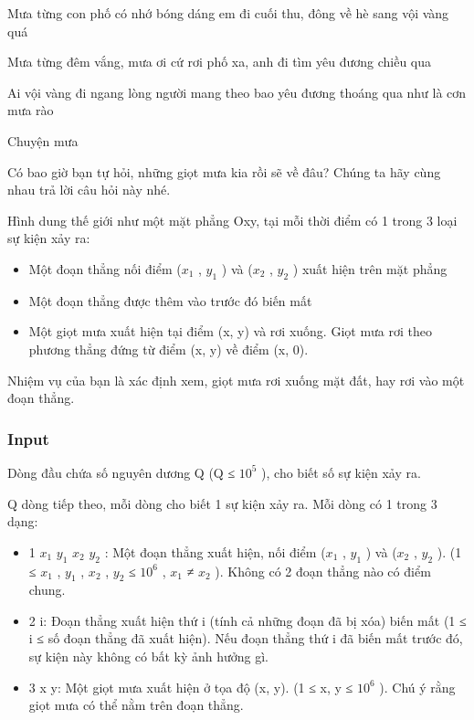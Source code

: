 

Mưa từng con phố có nhớ bóng dáng em đi cuối thu, đông về hè sang vội vàng quá

Mưa từng đêm vắng, mưa ơi cứ rơi phố xa, anh đi tìm yêu đương chiều qua

Ai vội vàng đi ngang lòng người mang theo bao yêu đương thoáng qua như là cơn mưa rào

Chuyện mưa

Có bao giờ bạn tự hỏi, những giọt mưa kia rồi sẽ về đâu? Chúng ta hãy cùng nhau trả lời câu hỏi này nhé.

Hình dung thế giới như một mặt phẳng Oxy, tại mỗi thời điểm có 1 trong 3 loại sự kiện xảy ra:
\begin{itemize}
	\item Một đoạn thẳng nối điểm ($x_{1}$ , $y_{1}$ ) và ($x_{2}$ , $y_{2}$ ) xuất hiện trên mặt phẳng
	\item Một đoạn thẳng được thêm vào trước đó biến mất
	\item Một giọt mưa xuất hiện tại điểm (x, y) và rơi xuống. Giọt mưa rơi theo phương thẳng đứng từ điểm (x, y) về điểm (x, 0).
\end{itemize}

Nhiệm vụ của bạn là xác định xem, giọt mưa rơi xuống mặt đất, hay rơi vào một đoạn thẳng.

\subsubsection{Input}

Dòng đầu chứa số nguyên dương Q (Q ≤ $10^{5}$ ), cho biết số sự kiện xảy ra.

Q dòng tiếp theo, mỗi dòng cho biết 1 sự kiện xảy ra. Mỗi dòng có 1 trong 3 dạng:
\begin{itemize}
	\item 1 $x_{1}$ $y_{1}$ $x_{2}$ $y_{2}$ : Một đoạn thẳng xuất hiện, nối điểm ($x_{1}$ , $y_{1}$ ) và ($x_{2}$ , $y_{2}$ ). (1 ≤ $x_{1}$ , $y_{1}$ , $x_{2}$ , $y_{2}$ ≤ $10^{6}$ , $x_{1}$ ≠ $x_{2}$ ). Không có 2 đoạn thẳng nào có điểm chung.
	\item 2 i: Đoạn thẳng xuất hiện thứ i (tính cả những đoạn đã bị xóa) biến mất (1 ≤ i ≤ số đoạn thẳng đã xuất hiện). Nếu đoạn thẳng thứ i đã biến mất trước đó, sự kiện này không có bất kỳ ảnh hưởng gì.
	\item 3 x y: Một giọt mưa xuất hiện ở tọa độ (x, y). (1 ≤ x, y ≤ $10^{6}$ ). Chú ý rằng giọt mưa có thể nằm trên đoạn thẳng.
\end{itemize}

